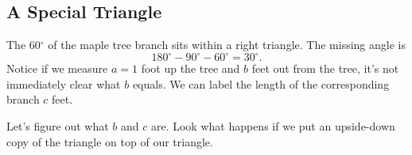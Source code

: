 \subsection*{A Special Triangle}
The 60$^\circ$ of the maple tree branch  sits within a right triangle.  The missing angle is $$180^\circ-90^\circ-60^\circ = 30^\circ.$$
Notice if we measure $a=1$ foot up the tree and $b$ feet out from the tree, it's not immediately clear what $b$ equals. We can label the length of the corresponding branch $c$ feet.

\begin{center}
\end{center}

Let's figure out what $b$ and $c$ are.  Look what happens if we put an upside-down copy of the triangle on top of our triangle. 

